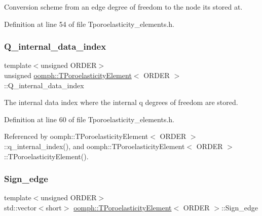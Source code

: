 Conversion scheme from an edge degree of freedom to the node it\textquotesingle{}s stored at. 



Definition at line 54 of file Tporoelasticity\+\_\+elements.\+h.

\mbox{\label{classoomph_1_1TPoroelasticityElement_a1f6d34cb8d26fb7d82e4fbd1a7a7c9a3}} 
\subsubsection{\texorpdfstring{Q\+\_\+internal\+\_\+data\+\_\+index}{Q\_internal\_data\_index}}
{\footnotesize\ttfamily template$<$unsigned O\+R\+D\+ER$>$ \\
unsigned \hyperlink{classoomph_1_1TPoroelasticityElement}{oomph\+::\+T\+Poroelasticity\+Element}$<$ O\+R\+D\+ER $>$\+::Q\+\_\+internal\+\_\+data\+\_\+index\hspace{0.3cm}{\ttfamily [private]}}



The internal data index where the internal q degrees of freedom are stored. 



Definition at line 60 of file Tporoelasticity\+\_\+elements.\+h.



Referenced by oomph\+::\+T\+Poroelasticity\+Element$<$ O\+R\+D\+E\+R $>$\+::q\+\_\+internal\+\_\+index(), and oomph\+::\+T\+Poroelasticity\+Element$<$ O\+R\+D\+E\+R $>$\+::\+T\+Poroelasticity\+Element().

\mbox{\label{classoomph_1_1TPoroelasticityElement_a350907258dbb3be942c027db0090e7b3}} 
\subsubsection{\texorpdfstring{Sign\+\_\+edge}{Sign\_edge}}
{\footnotesize\ttfamily template$<$unsigned O\+R\+D\+ER$>$ \\
std\+::vector$<$short$>$ \hyperlink{classoomph_1_1TPoroelasticityElement}{oomph\+::\+T\+Poroelasticity\+Element}$<$ O\+R\+D\+ER $>$\+::Sign\+\_\+edge\hspace{0.3cm}{\ttfamily [private]}}



